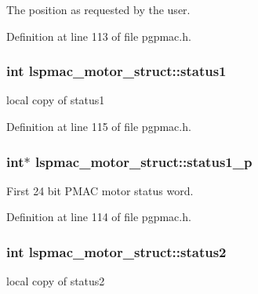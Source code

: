 The position as requested by the user. 



Definition at line 113 of file pgpmac.\-h.

\hypertarget{structlspmac__motor__struct_acb52b612b9237e8eec0b97fb1e76a35d}{
\subsubsection[{status1}]{\setlength{\rightskip}{0pt plus 5cm}int lspmac\-\_\-motor\-\_\-struct\-::status1}}\label{structlspmac__motor__struct_acb52b612b9237e8eec0b97fb1e76a35d}


local copy of status1 



Definition at line 115 of file pgpmac.\-h.

\hypertarget{structlspmac__motor__struct_a56c41875faf19c643e97c10519e6eb8c}{
\subsubsection[{status1\-\_\-p}]{\setlength{\rightskip}{0pt plus 5cm}int$\ast$ lspmac\-\_\-motor\-\_\-struct\-::status1\-\_\-p}}\label{structlspmac__motor__struct_a56c41875faf19c643e97c10519e6eb8c}


First 24 bit P\-M\-A\-C motor status word. 



Definition at line 114 of file pgpmac.\-h.

\hypertarget{structlspmac__motor__struct_a6a412224c09268c1dc92de9c2a1a2512}{
\subsubsection[{status2}]{\setlength{\rightskip}{0pt plus 5cm}int lspmac\-\_\-motor\-\_\-struct\-::status2}}\label{structlspmac__motor__struct_a6a412224c09268c1dc92de9c2a1a2512}


local copy of status2 



